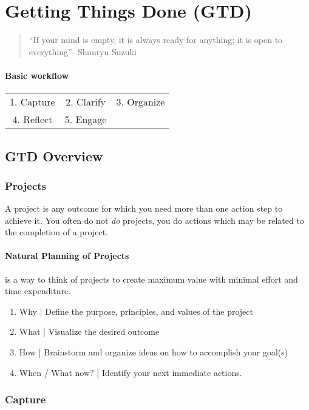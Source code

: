 \section{Getting Things Done (GTD)}

\begin{quote}
	``If your mind is empty, it is always ready for anything; it is open to everything''- Shunryu Suzuki
\end{quote}

\paragraph*{Basic workflow}
\begin{tabular}{ccc}
	1. Capture & 2. Clarify  &  3. Organize\\
	4. Reflect & 5. Engage &  \\
\end{tabular}

\subsection{GTD Overview}
\subsubsection*{Projects}
A project is any outcome for which you need more than one action step to achieve it. You often do not \emph{do} projects, you do actions which may be related to the completion of a project.

\paragraph*{Natural Planning of Projects} is a way to think of projects to create maximum value with minimal effort and time expenditure.
\begin{enumerate}
\item
	Why | Define the purpose, principles, and values of the project
\item
	What | Visualize the desired outcome
\item
	How | Brainstorm and organize ideas on how to accomplish your goal(s)
\item
	When / What now? | Identify your next immediate actions.
\end{enumerate}

\subsubsection*{Capture}

